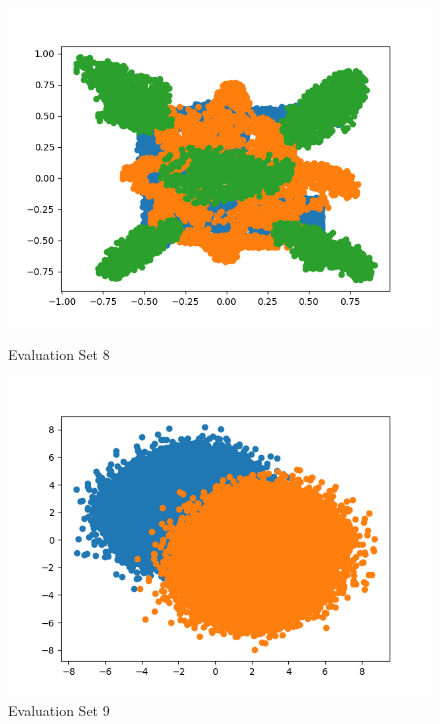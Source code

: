 \documentclass{article}
\begin{document}
\begin{figure}[H]
	\centering
	\begin{minipage}{.33\textwidth}
			\centering
			\includegraphics[width=1\linewidth]{../EvalSet 08.png}
			\caption{Evaluation Set 8}
	\end{minipage}\hfill
        \centering
	\begin{minipage}{.33\textwidth}
			\centering
			\includegraphics[width=1\linewidth]{../EvalSet 09.png}
			\caption{Evaluation Set 9}
	\end{minipage}\hfill
        \centering
	\begin{minipage}{.33\textwidth}
			\centering

\end{minipage}
\end{figure}
\end{document}
